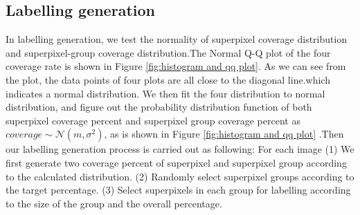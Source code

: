 \documentclass[runningheads,a4paper]{llncs}
\begin{document}
%
%


\subsection{Labelling generation}
In labelling generation, we test the normality of superpixel coverage distribution and superpixel-group coverage distribution.The Normal Q-Q plot of the four coverage rate is shown in Figure \ref{fig:histogram and qq plot}. As we can see from the plot, the data points of four plots are all close to the diagonal line.which indicates a normal distribution. We then fit the four distribution to normal distribution, and figure out the probability distribution function of both superpixel coverage percent and superpixel group coverage percent as $coverage \sim \mathcal{N} (m,\sigma^2)$, as is shown in Figure \ref{fig:histogram and qq plot} .Then our labelling generation process is carried out as following: For each image (1) We first generate two coverage percent of superpixel and superpixel group according to the calculated  distribution. (2) Randomly select superpixel groups according to the target percentage. (3) Select superpixels in each group for labelling according to the size of the group and the overall percentage.
\end{document}
